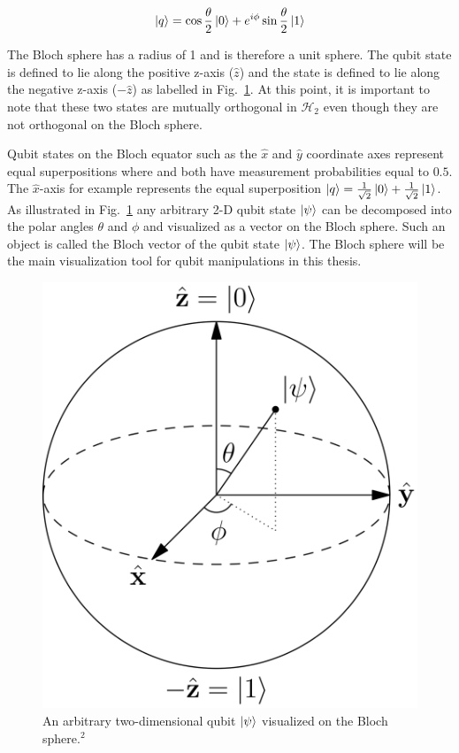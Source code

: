 \begin{equation}
\label{equ: blochqubit}
\ket{q} = \cos\frac{\theta}{2} \ket{0} + e^{i \phi} \sin\frac{\theta}{2} \ket{1}
\end{equation}

The Bloch sphere has a radius of 1 and is therefore a unit sphere. The \0 qubit state is defined to lie along the positive z-axis ($\hat{z}$) and the \1 state is defined to lie along the negative z-axis ($-\hat{z}$) as labelled in Fig.~\ref{fig:blochsphere}. At this point, it is important to note that these two states are mutually orthogonal in $\mathcal{H}_{2}$ even though they are not orthogonal on the Bloch sphere. 

Qubit states on the Bloch equator such as the $\hat{x}$ and $\hat{y}$ coordinate axes represent equal superpositions where \0 and \1 both have measurement probabilities equal to $0.5$. The $\hat{x}$-axis for example represents the equal superposition $\ket{q} = \frac{1}{\sqrt{2}} \ket{0} + \frac{1}{\sqrt{2}} \ket{1}$. As illustrated in Fig.~\ref{fig:blochsphere} any arbitrary 2-D qubit state $\ket{\psi}$ can be decomposed into the polar angles $\theta$ and $\phi$ and visualized as a vector on the Bloch sphere. Such an object is called the Bloch vector of the qubit state $\ket{\psi}$. The Bloch sphere will be the main visualization tool for qubit manipulations in this thesis.

\begin{figure}[!ht]
       \centering
       \includegraphics[scale=0.07]{img/blochsphere.png}
       \caption{\label{fig:blochsphere} An arbitrary two-dimensional qubit $\ket{\psi}$ visualized on the Bloch sphere.$^{2}$}
\end{figure}


